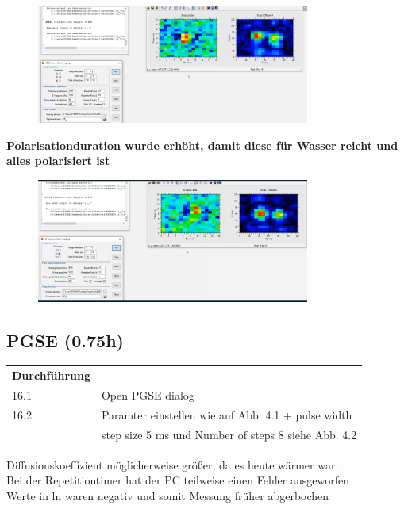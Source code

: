 \begin{figure}[H]
    \centering
    \includegraphics[width = 0.8\textwidth]{Screenshot2/15_5.jpg}
\end{figure}
\textbf{Polarisationduration wurde erhöht, damit diese für Wasser reicht und alles polarisiert ist}
\begin{figure}[H]
    \centering
    \includegraphics[width = 0.8\textwidth]{Screenshot2/15_6.jpg}
\end{figure}



\subsection{PGSE (0.75h)}


\begin{tabular}{ll}
    \textbf{Durchführung} & \\

    16.1 & Open PGSE dialog \\

    16.2 & Paramter einstellen wie auf Abb. 4.1 + pulse width  \\

         & step size 5 ms und Number of steps 8 siehe Abb. 4.2 \\
\end{tabular} 



Diffusionskoeffizient möglicherweise größer, da es heute wärmer war.\\
Bei der Repetitiontimer hat der PC teilweise einen Fehler ausgeworfen\\
Werte in ln waren negativ und somit Messung früher abgerbochen\\


